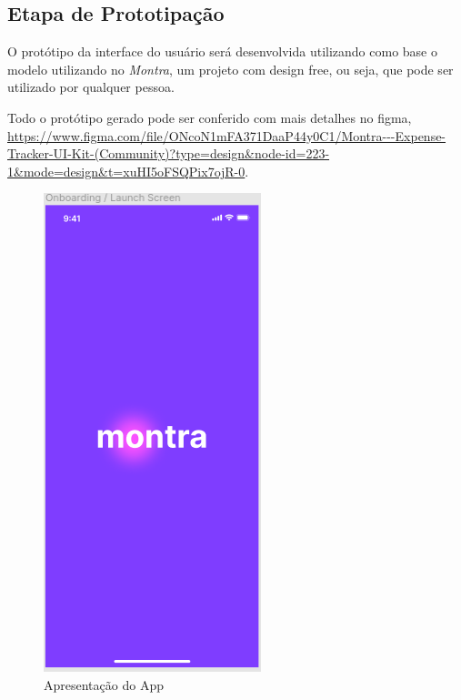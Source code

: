 \subsection{Etapa de Prototipação}

O protótipo da interface do usuário será desenvolvida utilizando como base o modelo utilizando no \textit{Montra}, um projeto com design free, ou seja, que pode ser utilizado por qualquer pessoa.

Todo o protótipo gerado pode ser conferido com mais detalhes no figma, \url{https://www.figma.com/file/ONcoN1mFA371DaaP44y0C1/Montra---Expense-Tracker-UI-Kit-(Community)?type=design&node-id=223-1&mode=design&t=xuHI5oFSQPix7ojR-0}.

\begin{figure}[!htb]
    \centering
    \caption{Apresentação do App}
    \includegraphics[scale=0.6]{images/presentation.png}
\end{figure}

